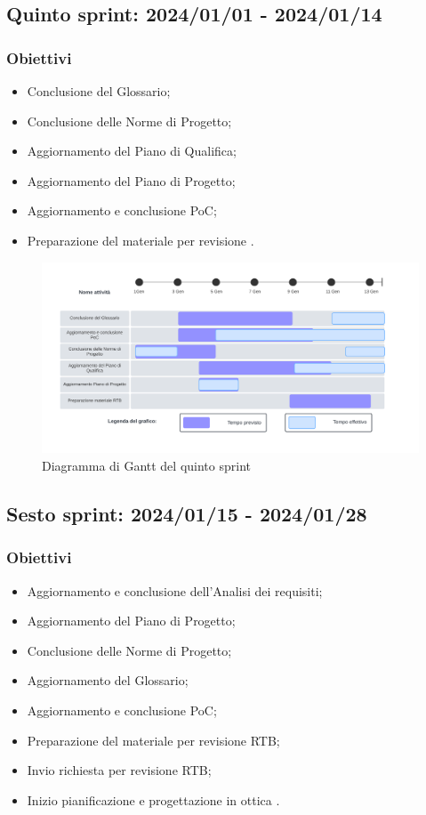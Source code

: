 \subsection{Quinto sprint: 2024/01/01 - 2024/01/14}
\subsubsection{Obiettivi}
\begin{itemize}[itemsep=-2pt]
    \item Conclusione del Glossario;
    \item Conclusione delle Norme di Progetto;
    \item Aggiornamento del Piano di Qualifica;
    \item Aggiornamento del Piano di Progetto;
    \item Aggiornamento e conclusione PoC;
    \item Preparazione del materiale per revisione .
\end{itemize}

\begin{figure}[h!]
    \centering  
    \includegraphics[width=\textwidth]{Roadmap5sprint.png}
    \caption{Diagramma di Gantt del quinto sprint}
    \label{fig:roadmap5s}
\end{figure}
\newpage

\subsection{Sesto sprint: 2024/01/15 - 2024/01/28}
\subsubsection{Obiettivi}
\begin{itemize}[itemsep=-2pt]
    \item Aggiornamento e conclusione dell'Analisi dei requisiti;
    \item Aggiornamento del Piano di Progetto;
    \item Conclusione delle Norme di Progetto;
    \item Aggiornamento del Glossario;
    \item Aggiornamento e conclusione PoC;
    \item Preparazione del materiale per revisione RTB;
    \item Invio richiesta per revisione RTB;
    \item Inizio pianificazione e progettazione in ottica .
\end{itemize}

